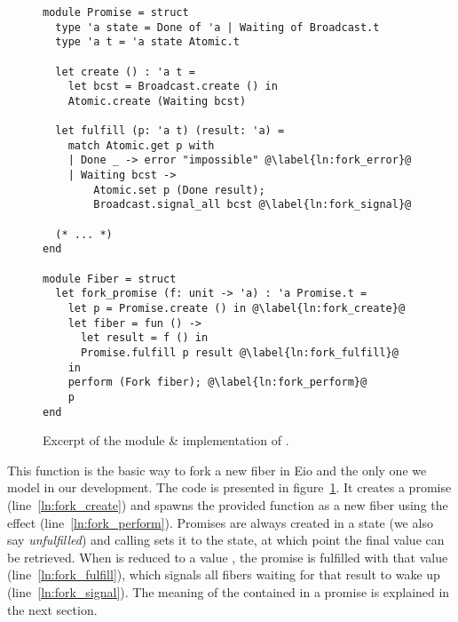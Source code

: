 
\subsubsection{}
\label{sec:sched-impl-fork}

\begin{figure}[ht]
  \begin{verbatim}
module Promise = struct
  type 'a state = Done of 'a | Waiting of Broadcast.t
  type 'a t = 'a state Atomic.t

  let create () : 'a t = 
    let bcst = Broadcast.create () in
    Atomic.create (Waiting bcst)

  let fulfill (p: 'a t) (result: 'a) = 
    match Atomic.get p with
    | Done _ -> error "impossible" @\label{ln:fork_error}@ 
    | Waiting bcst ->
        Atomic.set p (Done result);
        Broadcast.signal_all bcst @\label{ln:fork_signal}@ 

  (* ... *)
end
  
module Fiber = struct
  let fork_promise (f: unit -> 'a) : 'a Promise.t =
    let p = Promise.create () in @\label{ln:fork_create}@ 
    let fiber = fun () ->
      let result = f () in
      Promise.fulfill p result @\label{ln:fork_fulfill}@ 
    in
    perform (Fork fiber); @\label{ln:fork_perform}@
    p
end
  \end{verbatim}
  \caption{Excerpt of the  module \& implementation of .}
  \label{fig:sched-impl-fork}
\end{figure}

This function is the basic way to fork a new fiber in Eio and the only one we model in our development.
The code is presented in figure~\ref{fig:sched-impl-fork}.
It creates a promise (line~\ref{ln:fork_create}) and spawns the provided function as a new fiber using the \efork{} effect (line~\ref{ln:fork_perform}).
Promises are always created in a  state (we also say \emph{unfulfilled}) and calling  sets it to the  state, at which point the final value can be retrieved.
When  is reduced to a value , the promise is fulfilled with that value (line~\ref{ln:fork_fulfill}), which signals all fibers waiting for that result to wake up (line~\ref{ln:fork_signal}).
The meaning of the  contained in a promise is explained in the next section.

